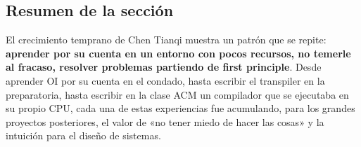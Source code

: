 \subsection{Resumen de la sección}

El crecimiento temprano de Chen Tianqi muestra un patrón que se repite: \textbf{aprender por su cuenta en un entorno con pocos recursos, no temerle al fracaso, resolver problemas partiendo de first principle}. Desde aprender OI por su cuenta en el condado, hasta escribir el transpiler en la preparatoria, hasta escribir en la clase ACM un compilador que se ejecutaba en su propio CPU, cada una de estas experiencias fue acumulando, para los grandes proyectos posteriores, el valor de «no tener miedo de hacer las cosas» y la intuición para el diseño de sistemas.
